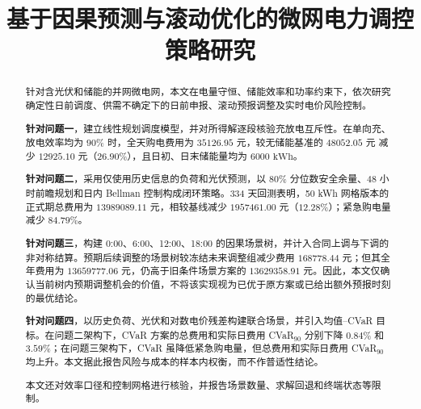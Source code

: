 \documentclass[withoutpreface]{cumcmthesis}
\title{基于因果预测与滚动优化的微网电力调控策略研究}
\begin{document}
\maketitle

\begin{abstract}
针对含光伏和储能的并网微电网，本文在电量守恒、储能效率和功率约束下，依次研究确定性日前调度、供需不确定下的日前申报、滚动预报调整及实时电价风险控制。

\textbf{针对问题一}，建立线性规划调度模型，并对所得解逐段核验充放电互斥性。在单向充、放电效率均为 $90\%$ 时，全天购电费用为 $35126.95\text{ 元}$，较无储能基准的 $48052.05\text{ 元}$ 减少 $12925.10\text{ 元}$（$26.90\%$），且日初、日末储能量均为 $6000\text{ kWh}$。

\textbf{针对问题二}，采用仅使用历史信息的负荷和光伏预测，以 $80\%$ 分位数安全余量、48 小时前瞻规划和日内 Bellman 控制构成闭环策略。334 天回测表明，50 kWh 网格版本的正式期总费用为 $13989089.11\text{ 元}$，相较基线减少 $1957461.00\text{ 元}$（$12.28\%$）；紧急购电量减少 $84.79\%$。

\textbf{针对问题三}，构建 0:00、6:00、12:00、18:00 的因果场景树，并计入合同上调与下调的非对称结算。预期后续调整的场景树较冻结未来调整组减少费用 $168778.44\text{ 元}$；但其全年费用为 $13659777.06\text{ 元}$，仍高于旧条件场景方案的 $13629358.91\text{ 元}$。因此，本文仅确认当前树内预期调整机会的价值，不将该实现视为已优于原方案或已给出额外预报时刻的最优结论。

\textbf{针对问题四}，以历史负荷、光伏和对数电价残差构建联合场景，并引入均值--CVaR 目标。在问题二架构下，CVaR 方案的总费用和实际日费用 CVaR$_{90}$ 分别下降 $0.84\%$ 和 $3.59\%$；在问题三架构下，CVaR 虽降低紧急购电量，但总费用和实际日费用 CVaR$_{90}$ 均上升。本文据此报告风险与成本的样本内权衡，而不作普适性结论。

本文还对效率口径和控制网格进行核验，并报告场景数量、求解回退和终端状态等限制。

\end{abstract}


\end{document}
